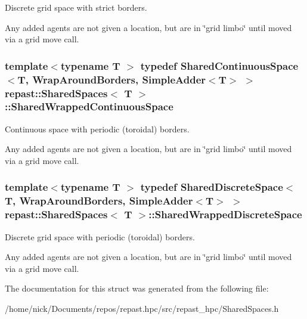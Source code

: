 Discrete grid space with strict borders. 

Any added agents are not given a location, but are in \char`\"{}grid limbo\char`\"{} until moved via a grid move call. \hypertarget{structrepast_1_1_shared_spaces_a2c0b9c9945a0f170f744be9002ff5921}{
\subsubsection[{Shared\-Wrapped\-Continuous\-Space}]{\setlength{\rightskip}{0pt plus 5cm}template$<$typename T $>$ typedef {\bf Shared\-Continuous\-Space}$<$T, {\bf Wrap\-Around\-Borders}, {\bf Simple\-Adder}$<$T$>$ $>$ {\bf repast\-::\-Shared\-Spaces}$<$ T $>$\-::{\bf Shared\-Wrapped\-Continuous\-Space}}}\label{structrepast_1_1_shared_spaces_a2c0b9c9945a0f170f744be9002ff5921}


Continuous space with periodic (toroidal) borders. 

Any added agents are not given a location, but are in \char`\"{}grid limbo\char`\"{} until moved via a grid move call. \hypertarget{structrepast_1_1_shared_spaces_a7e9474c0d17d53353b5e717986dd560f}{
\subsubsection[{Shared\-Wrapped\-Discrete\-Space}]{\setlength{\rightskip}{0pt plus 5cm}template$<$typename T $>$ typedef {\bf Shared\-Discrete\-Space}$<$T, {\bf Wrap\-Around\-Borders}, {\bf Simple\-Adder}$<$T$>$ $>$ {\bf repast\-::\-Shared\-Spaces}$<$ T $>$\-::{\bf Shared\-Wrapped\-Discrete\-Space}}}\label{structrepast_1_1_shared_spaces_a7e9474c0d17d53353b5e717986dd560f}


Discrete grid space with periodic (toroidal) borders. 

Any added agents are not given a location, but are in \char`\"{}grid limbo\char`\"{} until moved via a grid move call. 

The documentation for this struct was generated from the following file\-:\begin{DoxyCompactItemize}
\item 
/home/nick/\-Documents/repos/repast.\-hpc/src/repast\-\_\-hpc/Shared\-Spaces.\-h\end{DoxyCompactItemize}
